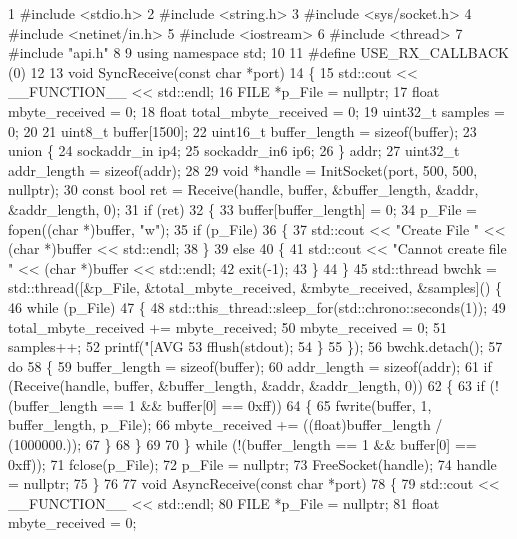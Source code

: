 \begin{DoxyCode}
1 #include <stdio.h>
2 #include <string.h>
3 #include <sys/socket.h>
4 #include <netinet/in.h>
5 #include <iostream>
6 #include <thread>
7 #include "api.h"
8 
9 using namespace std;
10 
11 #define USE\_RX\_CALLBACK (0)
12 
13 void SyncReceive(const char *port)
14 \{
15     std::cout << \_\_FUNCTION\_\_ << std::endl;
16     FILE *p\_File = nullptr;
17     float mbyte\_received = 0;
18     float total\_mbyte\_received = 0;
19     uint32\_t samples = 0;
20 
21     uint8\_t buffer[1500];
22     uint16\_t buffer\_length = sizeof(buffer);
23     union \{
24         sockaddr\_in ip4;
25         sockaddr\_in6 ip6;
26     \} addr;
27     uint32\_t addr\_length = sizeof(addr);
28 
29     void *handle = InitSocket(port, 500, 500, nullptr);
30     const bool ret = Receive(handle, buffer, &buffer\_length, &addr, &addr\_length, 0);
31     if (ret)
32     \{
33         buffer[buffer\_length] = 0;
34         p\_File = fopen((char *)buffer, "w");
35         if (p\_File)
36         \{
37             std::cout << "Create File " << (char *)buffer << std::endl;
38         \}
39         else
40         \{
41             std::cout << "Cannot create file " << (char *)buffer << std::endl;
42             exit(-1);
43         \}
44     \}
45     std::thread bwchk = std::thread([&p\_File, &total\_mbyte\_received, &mbyte\_received, &samples]() \{
46         while (p\_File)
47         \{
48             std::this\_thread::sleep\_for(std::chrono::seconds(1));
49             total\_mbyte\_received += mbyte\_received;
50             mbyte\_received = 0;
51             samples++;
52             printf("[AVG %
53             fflush(stdout);
54         \}
55     \});
56     bwchk.detach();
57     do
58     \{
59         buffer\_length = sizeof(buffer);
60         addr\_length = sizeof(addr);
61         if (Receive(handle, buffer, &buffer\_length, &addr, &addr\_length, 0))
62         \{
63             if (!(buffer\_length == 1 && buffer[0] == 0xff))
64             \{
65                 fwrite(buffer, 1, buffer\_length, p\_File);
66                 mbyte\_received += ((float)buffer\_length / (1000000.));
67             \}
68         \}
69 
70     \} while (!(buffer\_length == 1 && buffer[0] == 0xff));
71     fclose(p\_File);
72     p\_File = nullptr;
73     FreeSocket(handle);
74     handle = nullptr;
75 \}
76 
77 void AsyncReceive(const char *port)
78 \{
79     std::cout << \_\_FUNCTION\_\_ << std::endl;
80     FILE *p\_File = nullptr;
81     float mbyte\_received = 0;

\end{DoxyCode}

